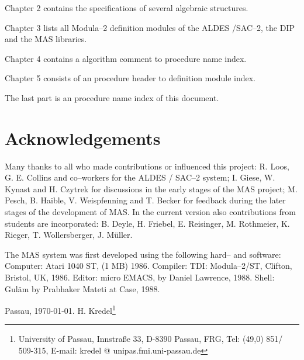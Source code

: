Chapter 2 
contains the specifications of 
several algebraic structures.

Chapter 3
lists all Modula--2 definition modules of 
the ALDES /SAC--2, the DIP and the MAS libraries.

Chapter 4
contains a algorithm comment to procedure name index.

Chapter 5
consists of an procedure header to definition module index.
 
The last part is an procedure name index of this document.  


\section*{Acknowledgements}

Many thanks to all who made contributions or influenced this project:
R. Loos, G. E. Collins and co--workers for the 
ALDES / SAC--2 system;
I. Giese, W. Kynast and H. Czytrek for discussions in the
early stages of the MAS project;
M. Pesch, B. Haible,
V. Weispfenning and T. Becker  
for feedback during 
the later stages of the development of MAS. 
In the current version also contributions from students 
are incorporated:
B. Deyle, H. Friebel, E. Reisinger, 
M. Rothmeier, K. Rieger, T. Wollersberger,
J. M\"uller. 

The MAS system was first developed using the 
following hard-- and software: 
Computer: Atari 1040 ST, (1 MB) 1986.  
Compiler: TDI: Modula--2/ST, Clifton, Bristol, UK, 1986.  
Editor: micro EMACS, by Daniel Lawrence, 1988.  
Shell: Gul\"am by Prabhaker Mateti at Case, 1988.  

\begin{center}
Passau, \today. \hfill H. Kredel\footnote{University of Passau, 
                                 Innstra\ss e 33, D-8390 Passau, FRG,
                                 Tel: (49,0) 851/ 509-315,
                                 E-mail: kredel @ 
                                 unipas.fmi.uni-passau.de}
\end{center}

